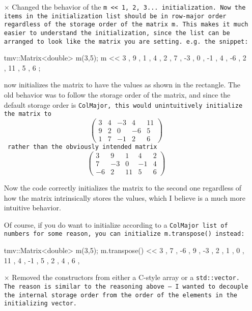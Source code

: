 \begin{itemize}

\item[$\times$] 
Changed the behavior of the \tt{m << 1, 2, 3...} initialization.  Now the items in the initialization list should be in row-major order regardless of the storage order of the matrix \tt{m}.  This makes it much easier to understand the initialization, since the list can be arranged to look like the matrix you are setting.  e.g. the snippet:
\begin{tmvcode}
tmv::Matrix<double> m(3,5);
m << 3 ,  9 ,  1 ,  4 ,  2 ,
     7 , -3 ,  0 , -1 ,  4 ,
    -6 ,  2 , 11 ,  5 ,  6 ;
\end{tmvcode}
now initializes the matrix to have the values as shown in the rectangle.  The old behavior was to follow the storage order of the matrix, and since the default storage order is \tt{ColMajor}, this would unintuitively initialize the matrix to
\begin{equation*}
\left(\begin{array}{ccccc}3 & 4 & -3 & 4 & 11   \\9 & 2 & 0 & -6 & 5   \\1 & 7 & -1 & 2 & 6 \end{array}\right) 
\end{equation*}
rather than the obviously intended matrix
\begin{equation*}
\left(\begin{array}{ccccc}3 & 9 & 1 & 4 & 2   \\7 & -3 & 0 & -1 & 4   \\-6 & 2 & 11 & 5 & 6 \end{array}\right) 
\end{equation*}

Now the code correctly initializes the matrix to the second one regardless of how the matrix intrinsically stores the values, which I believe is a much more intuitive behavior.

Of course, if you do want to initialize according to a \tt{ColMajor} list of numbers for some reason, you can initialize \tt{m.transpose()} instead:
\begin{tmvcode}
tmv::Matrix<double> m(3,5);
m.transpose() << 3 ,  7 , -6 ,
                 9 , -3 ,  2 ,
                 1 ,  0 , 11 ,
                 4 , -1 ,  5 ,
                 2 ,  4 ,  6 ,
\end{tmvcode}

\item[$\times$] 
Removed the constructors from either a C-style array or a \tt{std::vector}.  The reason is similar to the reasoning above -- I wanted to decouple the internal storage order from the order of the elements in the initializing vector. 


\end{itemize}
